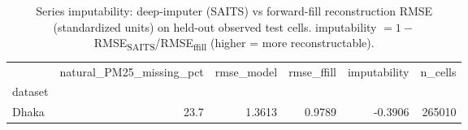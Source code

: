 \begin{table}
\caption{Series imputability: deep-imputer (SAITS) vs forward-fill reconstruction RMSE (standardized units) on held-out observed test cells. imputability $= 1 - $ RMSE\textsubscript{SAITS}/RMSE\textsubscript{ffill} (higher = more reconstructable).}
\label{tab:imputability}
\begin{tabular}{lrrrrr}
\toprule
 & natural\_PM25\_missing\_pct & rmse\_model & rmse\_ffill & imputability & n\_cells \\
dataset &  &  &  &  &  \\
\midrule
Dhaka & 23.7 & 1.3613 & 0.9789 & -0.3906 & 265010 \\
\bottomrule
\end{tabular}
\end{table}
